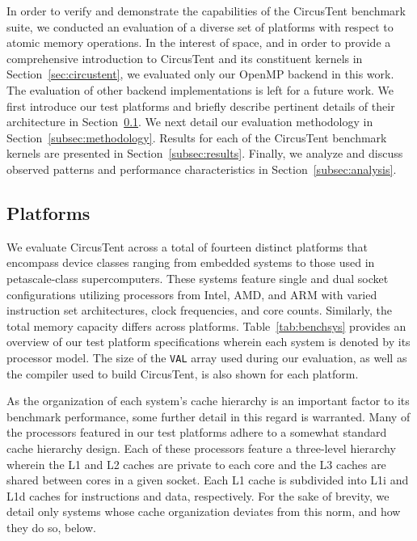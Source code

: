 
In order to verify and demonstrate the capabilities of the CircusTent benchmark suite, we conducted an evaluation of a diverse set of platforms with respect to atomic memory operations.
In the interest of space, and in order to provide a comprehensive introduction to CircusTent and its constituent kernels in Section~\ref{sec:circustent}, we evaluated only our OpenMP backend in this work.
The evaluation of other backend implementations is left for a future work.
We first introduce our test platforms and briefly describe pertinent details of their architecture in Section~\ref{subsec:platforms}.
We next detail our evaluation methodology in Section~\ref{subsec:methodology}.
Results for each of the CircusTent benchmark kernels are presented in Section~\ref{subsec:results}.
Finally, we analyze and discuss observed patterns and performance characteristics in Section~\ref{subsec:analysis}.

\subsection{Platforms}
\label{subsec:platforms}

We evaluate CircusTent across a total of fourteen distinct platforms that encompass device classes ranging from embedded systems to those used in petascale-class supercomputers.
These systems feature single and dual socket configurations utilizing processors from Intel, AMD, and ARM with varied instruction set architectures, clock frequencies, and core counts.
Similarly, the total memory capacity differs across platforms.
Table~\ref{tab:benchsys} provides an overview of our test platform specifications wherein each system is denoted by its processor model.
The size of the \texttt{VAL} array used during our evaluation, as well as the compiler used to build CircusTent, is also shown for each platform.

As the organization of each system's cache hierarchy is an important factor to its benchmark performance, some further detail in this regard is warranted.
Many of the processors featured in our test platforms adhere to a somewhat standard cache hierarchy design.
Each of these processors feature a three-level hierarchy wherein the L1 and L2 caches are private to each core and the L3 caches are shared between cores in a given socket.
Each L1 cache is subdivided into L1i and L1d caches for instructions and data, respectively.
For the sake of brevity, we detail only systems whose cache organization deviates from this norm, and how they do so, below.

